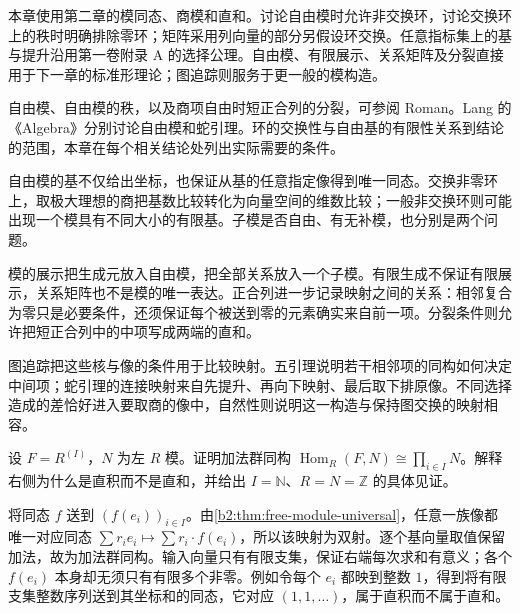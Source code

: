 \ProseParagraphBreak

本章使用第二章的模同态、商模和直和。讨论自由模时允许非交换环，讨论交换环上的秩时明确排除零环；矩阵采用列向量的部分另假设环交换。任意指标集上的基与提升沿用第一卷附录 A 的选择公理。自由模、有限展示、关系矩阵及分裂直接用于下一章的标准形理论；图追踪则服务于更一般的模构造。

\ProseParagraphBreak
自由模、自由模的秩，以及商项自由时短正合列的分裂，可参阅 Roman\cite[Chapter 5, The Rank of a Free Module, pp. 127--131; Theorem 5.6, p. 132]{Roman2008AdvancedLinearAlgebra}。Lang 的《Algebra》\cite[CHAPTER III, \S 4; \S 9]{Lang2002}分别讨论自由模和蛇引理。环的交换性与自由基的有限性关系到结论的范围，本章在每个相关结论处列出实际需要的条件。






\begin{chaptersummary}
	自由模的基不仅给出坐标，也保证从基的任意指定像得到唯一同态。交换非零环上，取极大理想的商把基数比较转化为向量空间的维数比较；一般非交换环则可能出现一个模具有不同大小的有限基。子模是否自由、有无补模，也分别是两个问题。

	\ProseParagraphBreak
	模的展示把生成元放入自由模，把全部关系放入一个子模。有限生成不保证有限展示，关系矩阵也不是模的唯一表达。正合列进一步记录映射之间的关系：相邻复合为零只是必要条件，还须保证每个被送到零的元素确实来自前一项。分裂条件则允许把短正合列中的中项写成两端的直和。

	\ProseParagraphBreak
	图追踪把这些核与像的条件用于比较映射。五引理说明若干相邻项的同构如何决定中间项；蛇引理的连接映射来自先提升、再向下映射、最后取下排原像。不同选择造成的差恰好进入要取商的像中，自然性则说明这一构造与保持图交换的映射相容。
\end{chaptersummary}

\BookExercises

\begin{exercise}\label{b2:ex:03-free-hom}
	设 \(F=R^{(I)}\)，\(N\) 为左 \(R\) 模。证明加法群同构 \(\operatorname{Hom}_R(F,N)\cong\prod_{i\in I}N\)。解释右侧为什么是直积而不是直和，并给出 \(I=\mathbb N\)、\(R=N=\mathbb Z\) 的具体见证。
\end{exercise}
\begin{solution}
	将同态 \(f\) 送到 \((f(e_i))_{i\in I}\)。由\cref{b2:thm:free-module-universal}，任意一族像都唯一对应同态 \(\sum r_i e_i\mapsto\sum r_i\cdot f(e_i)\)，所以该映射为双射。逐个基向量取值保留加法，故为加法群同构。输入向量只有有限支集，保证右端每次求和有意义；各个 \(f(e_i)\) 本身却无须只有有限多个非零。例如令每个 \(e_i\) 都映到整数 \(1\)，得到将有限支集整数序列送到其坐标和的同态，它对应 \((1,1,\ldots)\)，属于直积而不属于直和。
\end{solution}

